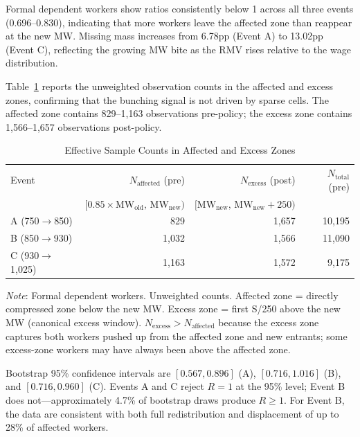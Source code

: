 \documentclass[12pt]{article}
\begin{document}
Formal dependent workers show ratios consistently below 1 across all three events (0.696--0.830), indicating that more workers leave the affected zone than reappear at the new MW. Missing mass increases from 6.78pp (Event A) to 13.02pp (Event C), reflecting the growing MW bite as the RMV rises relative to the wage distribution.

Table~\ref{tab:effective_n} reports the unweighted observation counts in the affected and excess zones, confirming that the bunching signal is not driven by sparse cells. The affected zone contains 829--1,163 observations pre-policy; the excess zone contains 1,566--1,657 observations post-policy.

\begin{table}[H]
\centering
\caption{Effective Sample Counts in Affected and Excess Zones}
\label{tab:effective_n}
\begin{threeparttable}
\small
\begin{tabular}{lrrr}
\toprule
Event & $N_\text{affected}$ (pre) & $N_\text{excess}$ (post) & $N_\text{total}$ (pre) \\
      & $[0.85\times\text{MW}_\text{old},\,\text{MW}_\text{new})$ &
        $[\text{MW}_\text{new},\,\text{MW}_\text{new}+250)$ & \\
\midrule
A (750$\to$850)   & 829   & 1,657 & 10,195 \\
B (850$\to$930)   & 1,032 & 1,566 & 11,090 \\
C (930$\to$1,025) & 1,163 & 1,572 &  9,175 \\
\bottomrule
\end{tabular}
\begin{tablenotes}
\small
\item \textit{Note}: Formal dependent workers. Unweighted counts. Affected zone = directly compressed zone below the new MW. Excess zone = first S/250 above the new MW (canonical excess window). $N_\text{excess} > N_\text{affected}$ because the excess zone captures both workers pushed up from the affected zone and new entrants; some excess-zone workers may have always been above the affected zone.
\end{tablenotes}
\end{threeparttable}
\end{table}

Bootstrap 95\% confidence intervals are $[0.567, 0.896]$ (A), $[0.716, 1.016]$ (B), and $[0.716, 0.960]$ (C). Events A and C reject $R = 1$ at the 95\% level; Event B does not---approximately 4.7\% of bootstrap draws produce $R \geq 1$. For Event B, the data are consistent with both full redistribution and displacement of up to 28\% of affected workers.
\end{document}
